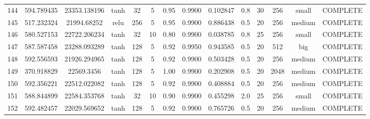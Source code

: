 \begin{longtable}{cccccccccccccc}
                      144 &                 594.789435 &                       23353.138196 &            tanh &          32 &              5 &        0.95 & 0.9900 &       0.102847 &             0.8 &                 30 &      256 &     small & COMPLETE \\
                      145 &                 517.232324 &                        21994.68252 &            relu &         256 &              5 &        0.95 & 0.9900 &       0.886438 &             0.5 &                 20 &      256 &    medium & COMPLETE \\
                      146 &                 580.527153 &                       22722.206234 &            tanh &          32 &             10 &        0.80 & 0.9900 &       0.038785 &             0.8 &                 25 &      256 &     small & COMPLETE \\
                      147 &                 587.587458 &                       23288.093289 &            tanh &         128 &              5 &        0.92 & 0.9950 &       0.943585 &             0.5 &                 20 &      512 &       big & COMPLETE \\
                      148 &                 592.556593 &                       21926.294965 &            tanh &         128 &              5 &        0.92 & 0.9900 &       0.503428 &             0.5 &                 20 &      256 &    medium & COMPLETE \\
                      149 &                 370.918829 &                         22569.3456 &            tanh &         128 &              5 &        1.00 & 0.9900 &       0.202908 &             0.5 &                 20 &     2048 &    medium & COMPLETE \\
                      150 &                 592.356221 &                       22512.022082 &            tanh &         128 &              5 &        0.92 & 0.9900 &       0.408884 &             0.5 &                 20 &      256 &    medium & COMPLETE \\
                      151 &                 588.844899 &                       22584.353768 &            tanh &          32 &             10 &        0.90 & 0.9900 &       0.455298 &             2.0 &                 25 &      256 &     small & COMPLETE \\
                      152 &                 592.482457 &                       22029.569652 &            tanh &         128 &              5 &        0.92 & 0.9900 &       0.765726 &             0.5 &                 20 &      256 &    medium & COMPLETE \\

\end{longtable}
